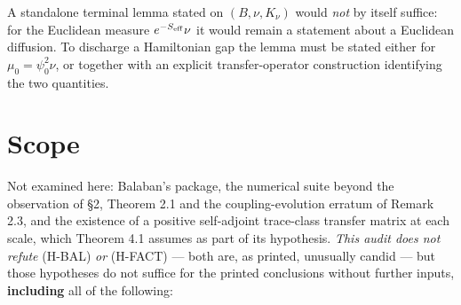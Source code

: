 \documentclass[11pt]{article}
\begin{document}
A standalone terminal lemma stated on $(B,\nu,K_\nu)$ would \emph{not} by itself
suffice: for the Euclidean measure $e^{-S_{\rm eff}}\nu$ it would remain a statement
about a Euclidean diffusion. To discharge a Hamiltonian gap the lemma must be stated
either for $\mu_0=\psi_0^2\nu$, or together with an explicit transfer-operator
construction identifying the two quantities.

\section{Scope}

Not examined here: Balaban's package, the numerical suite beyond the observation of
\S2, Theorem 2.1 and the coupling-evolution erratum of Remark 2.3, and the existence
of a positive self-adjoint trace-class transfer matrix at each scale, which Theorem
4.1 assumes as part of its hypothesis. \emph{This audit does not refute} (H-BAL)
\emph{or} (H-FACT) --- both are, as printed, unusually candid --- but those hypotheses
do not suffice for the printed conclusions without further inputs, \textbf{including}
all of the following:
\end{document}
